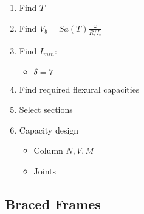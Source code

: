 \begin{enumerate}
\def\labelenumi{\arabic{enumi}.}
\tightlist
\item
  Find \(T\)
\item
  Find \(V_b = Sa(T)\frac{\omega}{R/I_e}\)
\item
  Find \(I_{min}\):

  \begin{itemize}
  \tightlist
  \item
    \(\delta = 7\)
  \end{itemize}
\item
  Find required flexural capacities
\item
  Select sections
\item
  Capacity design

  \begin{itemize}
  \tightlist
  \item
    Column \(N,V,M\)
  \item
    Joints
  \end{itemize}
\end{enumerate}

\hypertarget{braced-frames}{%
\subsection{Braced Frames}\label{braced-frames}}

